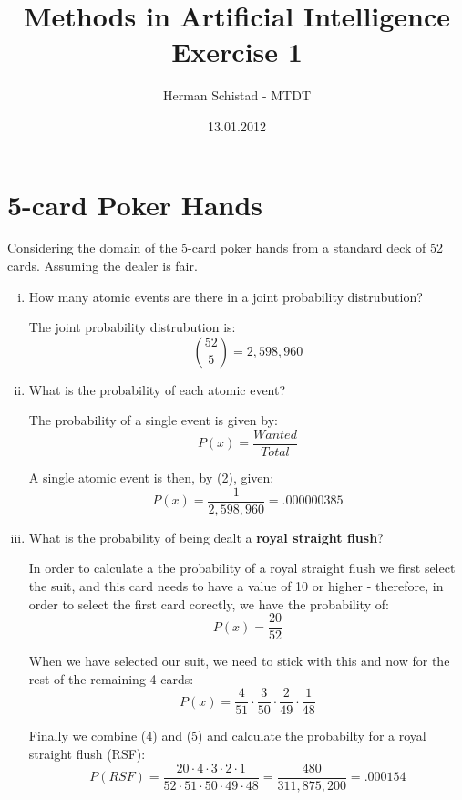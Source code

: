\documentclass{article}
\title{Methods in Artificial Intelligence \\
        \normalsize Exercise 1}
\author{Herman Schistad - MTDT}
\date{13.01.2012}
\begin{document}
\maketitle

\section*{5-card Poker Hands}
Considering the domain of the 5-card poker hands from a standard deck of 52 cards. Assuming the dealer is fair.
\begin{enumerate}[(i)]
\item How many atomic events are there in a joint probability distrubution?

The joint probability distrubution is:
\begin{equation}
{52 \choose 5} = 2,598,960
\end{equation}

\item What is the probability of each atomic event?

The probability of a single event is given by:
\begin{equation}
P(x) = \frac{Wanted}{Total}
\end{equation}

A single atomic event is then, by (2), given: 
\begin{equation}
P(x) = \frac{1}{2,598,960} = .000000385
\end{equation}

\item What is the probability of being dealt a {\bf royal straight flush}?

In order to calculate a the probability of a royal straight flush we first select the suit, and this card needs to have a value of 10 or higher - therefore, in order to select the first card corectly,  we have the probability of:
\begin{equation}
P(x) = \frac{20}{52}
\end{equation}

When we have selected our suit, we need to stick with this and now for the rest of the remaining 4 cards:
\begin{equation}
P(x) = \frac{4}{51} \cdot \frac{3}{50} \cdot \frac{2}{49} \cdot \frac{1}{48}
\end{equation}

Finally we combine (4) and (5) and calculate the probabilty for a royal straight flush (RSF):
\begin{equation}
P(RSF) = \frac{20 \cdot 4 \cdot 3 \cdot 2 \cdot 1}{52 \cdot 51 \cdot 50 \cdot 49 \cdot 48} = \frac{480}{311,875,200} = .000154
\end{equation}


\end{enumerate}
\end{document}
